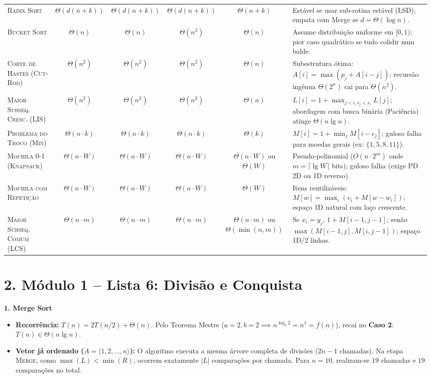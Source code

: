 \documentclass[11pt,a4paper]{article}
\newcommand{\topico}[1]{\par\medskip\textbf{\color{azul}#1}\par}
\newcommand{\secao}[1]{\section*{\color{azul}#1}}
\begin{document}
\begin{center}
{\begin{tabular}{lccccp{5.5cm}}
\textsc{Radix Sort} & $\Theta(d(n+k))$ & $\Theta(d(n+k))$ & $\Theta(d(n+k))$ & $\Theta(n + k)$ & Estável se usar sub-rotina estável (LSD); empata com Merge se $d = \Theta(\log n)$. \\
\textsc{Bucket Sort} & $\Theta(n)$ & $\Theta(n)$ & $\Theta(n^2)$ & $\Theta(n)$ & Assume distribuição uniforme em $[0, 1)$; pior caso quadrático se tudo colidir num balde. \\
\midrule
\textsc{Corte de Hastes (Cut-Rod)} & $\Theta(n^2)$ & $\Theta(n^2)$ & $\Theta(n^2)$ & $\Theta(n)$ & Subestrutura ótima: $A[i]=\max(p_j+A[i-j])$; recursão ingênua $\Theta(2^n)$ cai para $\Theta(n^2)$. \\
\textsc{Maior Subseq. Cresc. (LIS)} & $\Theta(n^2)$ & $\Theta(n^2)$ & $\Theta(n^2)$ & $\Theta(n)$ & $L[i] = 1 + \max_{j < i, s_j < s_i} L[j]$; abordagem com busca binária (Paciência) atinge $\Theta(n \lg n)$. \\
\textsc{Problema do Troco (Min)} & $\Theta(n \cdot k)$ & $\Theta(n \cdot k)$ & $\Theta(n \cdot k)$ & $\Theta(k)$ & $M[i] = 1 + \min_j M[i - c_j]$; guloso falha para moedas gerais (ex: $\{1, 5, 8, 11\}$). \\
\textsc{Mochila 0-1 (Knapsack)} & $\Theta(n \cdot W)$ & $\Theta(n \cdot W)$ & $\Theta(n \cdot W)$ & $\Theta(n \cdot W)$ ou $\Theta(W)$ & Pseudo-polinomial ($O(n \cdot 2^m)$ onde $m=\lceil\lg W\rceil$ bits); guloso falha (exige PD 2D ou 1D reverso). \\
\textsc{Mochila com Repetição} & $\Theta(n \cdot W)$ & $\Theta(n \cdot W)$ & $\Theta(n \cdot W)$ & $\Theta(W)$ & Itens reutilizáveis: $M[w]=\max_i(v_i + M[w-w_i])$; espaço 1D natural com laço crescente. \\
\textsc{Maior Subseq. Comum (LCS)} & $\Theta(n \cdot m)$ & $\Theta(n \cdot m)$ & $\Theta(n \cdot m)$ & $\Theta(n \cdot m)$ ou $\Theta(\min(n,m))$ & Se $x_i = y_j$, $1 + M[i-1,j-1]$; senão $\max(M[i-1,j], M[i,j-1])$; espaço 1D/2 linhas. \\
\bottomrule
\end{tabular}
}
\end{center}

\vspace{4pt}
\newpage
\secao{2. Módulo 1 -- Lista 6: Divisão e Conquista}

\topico{1. Merge Sort}
\begin{itemize}
  \item \textbf{Recorrência:} $T(n) = 2T(n/2) + \Theta(n)$. Pelo Teorema Mestre ($a=2, b=2 \implies n^{\log_2 2} = n^1 = f(n)$), recai no \textbf{Caso 2}: $T(n) \in \Theta(n \lg n)$.
  \item \textbf{Vetor já ordenado ($A = \langle 1, 2, \dots, n \rangle$):} O algoritmo executa a mesma árvore completa de divisões ($2n-1$ chamadas). Na etapa \textsc{Merge}, como $\max(L) < \min(R)$, ocorrem exatamente $|L|$ comparações por chamada. Para $n=10$, realizam-se $19$ chamadas e $19$ comparações no total.
\end{itemize}
\end{document}
